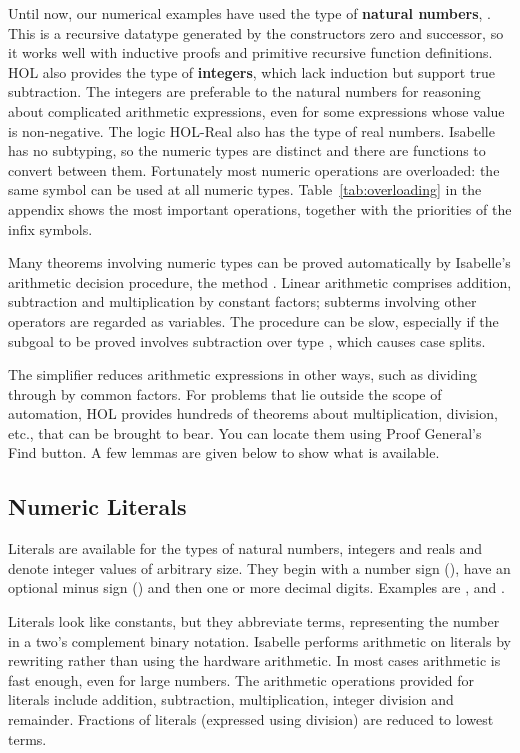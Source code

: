 Until now, our numerical examples have used the type of \textbf{natural
numbers},
.  This is a recursive datatype generated by the constructors
zero  and successor, so it works well with inductive proofs and primitive
recursive function definitions.  HOL also provides the type
 of \textbf{integers}, which lack induction but support true
subtraction.  The integers are preferable to the natural numbers for reasoning about
complicated arithmetic expressions, even for some expressions whose
value is non-negative.  The logic HOL-Real also has the type
 of real numbers.  Isabelle has no subtyping,  so the numeric
types are distinct and there are  functions to convert between them.
Fortunately most numeric operations are overloaded: the same symbol can be
used at all numeric types. Table~\ref{tab:overloading} in the appendix
shows the most important operations, together with the priorities of the
infix symbols.


Many theorems involving numeric types can be proved automatically by
Isabelle's arithmetic decision procedure, the method
.  Linear arithmetic comprises addition, subtraction
and multiplication by constant factors; subterms involving other operators
are regarded as variables.  The procedure can be slow, especially if the
subgoal to be proved involves subtraction over type , which 
causes case splits.  

The simplifier reduces arithmetic expressions in other
ways, such as dividing through by common factors.  For problems that lie
outside the scope of automation, HOL provides hundreds of
theorems about multiplication, division, etc., that can be brought to
bear.  You can locate them using Proof General's Find
button.  A few lemmas are given below to show what
is available.

\subsection{Numeric Literals}
\label{sec:numerals}

Literals are available for the types of natural numbers, integers 
and reals and denote integer values of arbitrary size. 
They begin 
with a number sign (\isa{\#}), have an optional minus sign (\isa{-}) and 
then one or more decimal digits. Examples are ,  
and .

Literals look like constants, but they abbreviate 
terms, representing the number in a two's complement binary notation. 
Isabelle performs arithmetic on literals by rewriting rather 
than using the hardware arithmetic. In most cases arithmetic 
is fast enough, even for large numbers. The arithmetic operations 
provided for literals include addition, subtraction, multiplication, 
integer division and remainder.  Fractions of literals (expressed using
division) are reduced to lowest terms.

